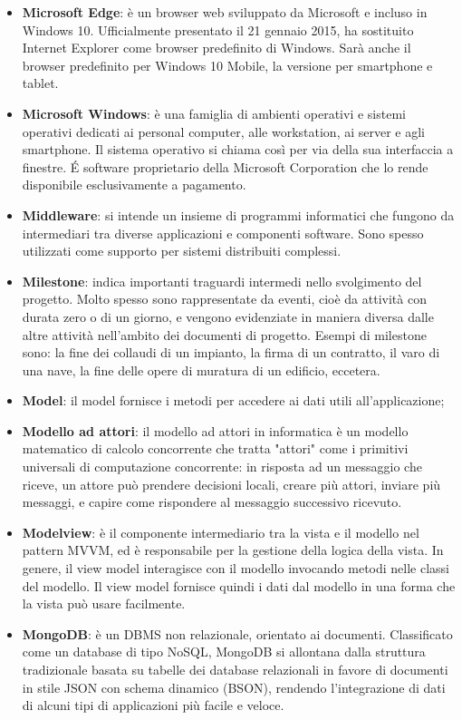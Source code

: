 \begin{itemize}
	\item
	\textbf{Microsoft Edge}: è un browser web sviluppato da Microsoft e incluso in Windows 10. Ufficialmente presentato il 21 gennaio 2015, ha sostituito Internet Explorer come browser predefinito di Windows. Sarà anche il browser predefinito per Windows 10 Mobile, la versione per smartphone e tablet.
	\item
	\textbf{Microsoft Windows}: è una famiglia di ambienti operativi e sistemi operativi dedicati ai personal computer, alle workstation, ai server e agli smartphone. Il sistema operativo si chiama così per via della sua interfaccia a finestre.
	\'E software proprietario della Microsoft Corporation che lo rende disponibile esclusivamente a pagamento.
	\item
	\textbf{Middleware}: si intende un insieme di programmi informatici che fungono da intermediari tra diverse applicazioni e componenti software. Sono spesso utilizzati come supporto per sistemi distribuiti complessi.
	\item
	\textbf{Milestone}: indica importanti traguardi intermedi nello svolgimento del progetto. Molto spesso sono rappresentate da eventi, cioè da attività con durata zero o di un giorno, e vengono evidenziate in maniera diversa dalle altre attività nell'ambito dei documenti di progetto. Esempi di milestone sono: la fine dei collaudi di un impianto, la firma di un contratto, il varo di una nave, la fine delle opere di muratura di un edificio, eccetera.
	\item
	\textbf{Model}: il model fornisce i metodi per accedere ai dati utili all'applicazione;
	\item
	\textbf{Modello ad attori}: il modello ad attori in informatica è un modello matematico di calcolo concorrente che tratta "attori" come i primitivi universali di computazione concorrente: in risposta ad un messaggio che riceve, un attore può prendere decisioni locali, creare più attori, inviare più messaggi, e capire come rispondere al messaggio successivo ricevuto. 
	\item
	\textbf{Modelview}: è il componente intermediario tra la vista e il modello nel pattern MVVM, ed è responsabile per la gestione della logica della vista. In genere, il view model interagisce con il modello invocando metodi nelle classi del modello. Il view model fornisce quindi i dati dal modello in una forma che la vista può usare facilmente.
	\item
	\textbf{MongoDB}: è un DBMS non relazionale, orientato ai documenti. Classificato come un database di tipo NoSQL, MongoDB si allontana dalla struttura tradizionale basata su tabelle dei database relazionali in favore di documenti in stile JSON con schema dinamico (BSON), rendendo l'integrazione di dati di alcuni tipi di applicazioni più facile e veloce. 

\end{itemize}
